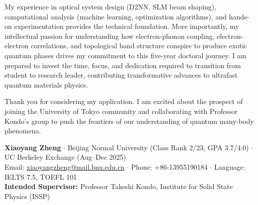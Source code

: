 \documentclass[11pt,a4paper]{article}
\begin{document}
My experience in optical system design (D2NN, SLM beam shaping), computational analysis (machine learning, optimization algorithms), and hands-on experimentation provides the technical foundation. More importantly, my intellectual passion for understanding how electron-phonon coupling, electron-electron correlations, and topological band structure conspire to produce exotic quantum phases drives my commitment to this five-year doctoral journey. I am prepared to invest the time, focus, and dedication required to transition from student to research leader, contributing transformative advances to ultrafast quantum materials physics.

Thank you for considering my application. I am excited about the prospect of joining the University of Tokyo community and collaborating with Professor Kondo's group to push the frontiers of our understanding of quantum many-body phenomena.

\vspace{0.5em}

\noindent
\textbf{Xiaoyang Zheng} $\cdot$ Beijing Normal University (Class Rank 2/23, GPA 3.7/4.0) $\cdot$ UC Berkeley Exchange (Aug--Dec 2025)\\
Email: \href{mailto:xiaoyangzheng@mail.bnu.edu.cn}{xiaoyangzheng@mail.bnu.edu.cn} $\cdot$ Phone: +86-13955190184 $\cdot$ Language: IELTS 7.5, TOEFL 101\\
\textbf{Intended Supervisor:} Professor Takeshi Kondo, Institute for Solid State Physics (ISSP)
\end{document}

